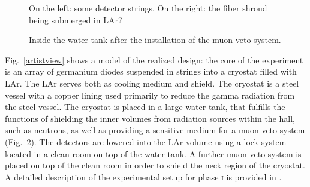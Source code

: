\begin{figure}
	\centering
	\caption{On the left: some detector strings. On the right: the fiber shroud being submerged in LAr?}\label{fig:stringsfibers}
\end{figure}
\begin{figure}
	\centering
	\caption{Inside the water tank after the installation of the muon veto system.}\label{fig:muonveto}
\end{figure}

Fig.~\ref{artistview} shows a model of the realized design: the core of the experiment is an array of germanium diodes suspended in strings into a cryostat filled with LAr. The LAr serves both as cooling medium and shield. The cryostat is a steel vessel with a copper lining used primarily to reduce the gamma radiation from the steel vessel. The cryostat is placed in a large water tank, that fulfills the functions of shielding the inner volumes from radiation sources within the hall, such as neutrons, as well as providing a sensitive medium for a muon veto system (Fig.~\ref{fig:muonveto}). The detectors are lowered into the LAr volume using a lock system located in a clean room on top of the water tank. A further muon veto system is placed on top of the clean room in order to shield the neck region of the cryostat. A detailed description of the experimental setup for phase \textsc{i} is provided in \cite{gerdadescription}.

